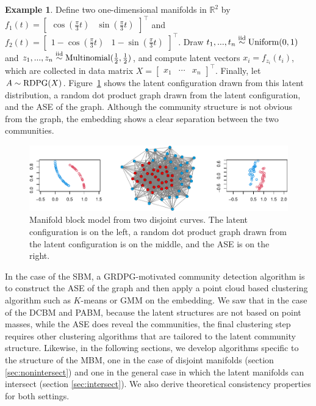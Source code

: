 \documentclass[
  11pt,
]{article}
\theoremstyle{definition}
\theoremstyle{definition}
\newtheorem{example}{Example}[section]
\theoremstyle{definition}
\theoremstyle{definition}
\theoremstyle{remark}
\begin{document}
\begin{example}
\label{ex:separated-curves}
Define two one-dimensional manifolds in $\mathbb{R}^2$ by $f_1(t) = \begin{bmatrix} \cos(\frac{\pi}{3} t) & \sin(\frac{\pi}{3} t) \end{bmatrix}^\top$ and $f_2(t) = \begin{bmatrix} 1 - \cos(\frac{\pi}{3} t) & 1 - \sin(\frac{\pi}{3} t) \end{bmatrix}^\top$.
Draw $t_1, ..., t_n \stackrel{\mathrm{iid}}{\sim} \mathrm{Uniform}(0, 1)$ and $z_1, ..., z_n \stackrel{\mathrm{iid}}{\sim} \mathrm{Multinomial}(\frac{1}{2}, \frac{1}{2})$, and compute latent vectors $x_i = f_{z_i}(t_i)$, which are collected in data matrix $X = \begin{bmatrix} x_1 & \cdots & x_n \end{bmatrix}^\top$. 
Finally, let $A \sim \mathrm{RDPG}(X)$. Figure~\ref{fig:two-curves} shows the latent configuration drawn from this latent distribution, a random dot product graph drawn from the latent configuration, and the ASE of the graph. 
Although the community structure is not obvious from the graph, the embedding shows a clear separation between the two communities. 

\begin{figure}[H]

{\centering \includegraphics{draft_files/figure-latex/two-curves-1} 

}

\caption{Manifold block model from two disjoint curves. The latent configuration is on the left, a random dot product graph drawn from the latent configuration is on the middle, and the ASE is on the right.}\label{fig:two-curves}
\end{figure}
\end{example}

In the case of the SBM, a GRDPG-motivated community detection algorithm is to construct the ASE of the graph and then apply a point cloud based clustering algorithm such as \(K\)-means or GMM on the embedding.
We saw that in the case of the DCBM and PABM, because the latent structures are not based on point masses, while the ASE does reveal the communities, the final clustering step requires other clustering algorithms that are tailored to the latent community structure.
Likewise, in the following sections, we develop algorithms specific to the structure of the MBM, one in the case of disjoint manifolds (section \ref{sec:nonintersect}) and one in the general case in which the latent manifolds can intersect (section \ref{sec:intersect}).
We also derive theoretical consistency properties for both settings.
\end{document}
